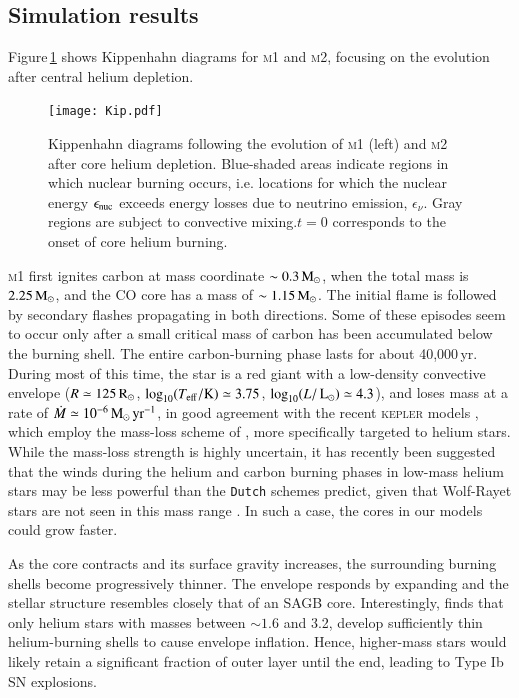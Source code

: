 \documentclass[twocolumn]{aa}
\begin{document}
\subsection{Simulation results}
Figure\,\ref{fig:1} shows Kippenhahn diagrams for 
 \textsc{m1} and \textsc{m2}, focusing on the evolution after central helium depletion.
\begin{figure}[htb!]
  \centering 
  \texttt{[image: Kip.pdf]}
  \caption{Kippenhahn diagrams following the evolution of \textsc{m1} (left) and \textsc{m2} after core helium depletion. Blue-shaded areas indicate regions in which nuclear burning occurs, i.e. locations for which the nuclear energy $\epsilon_{\rm nuc}$ exceeds energy losses due to neutrino emission, $\epsilon_\nu$. Gray regions are subject to convective mixing.$t=0$ corresponds to the onset of core helium burning.}
  \label{fig:1}
\end{figure}
\textsc{m1} first ignites carbon at mass coordinate $\sim 0.3\mathrm{\,M_\odot}$, when the total mass  is $ 2.25\mathrm{\,M_\odot}$, and the CO core has a mass of $\sim 1.15\mathrm{\,M_\odot}$.  
The initial flame is followed by secondary flashes propagating in both 
directions. Some of these episodes seem to occur only after a small critical 
mass of carbon has been accumulated below the burning shell. The entire carbon-burning phase lasts for about 
40,000\,yr. During most of this time, the star is a red giant with a low-density convective envelope  
($R\simeq 125\mathrm{\,R_\odot}$, $\log_{10} (T_{\mathrm{eff}} /\mathrm{K})\simeq 3.75$, $\log_{10} (L/\mathrm{\,L_\odot})\simeq 
4.3$), and loses mass at a rate of  
$\dot{M}\simeq10^{-6}\mathrm{\,M_{\odot}\,yr^{-1}}$, in good agreement with the
recent \textsc{kepler} models \citep{Woosley:2019sdf}, which employ the mass-loss scheme of \cite{Yoon:2017dme}, more specifically targeted to helium stars. While the mass-loss strength is highly uncertain, it has recently been suggested that the winds during the helium and carbon burning phases in low-mass helium stars may be less powerful than the \texttt{Dutch} schemes predict, given that Wolf-Rayet stars are not seen in this mass range \citep{Graefener2017,Vink:2017ujd}. In such a case, the cores in our models could grow faster.

As the core contracts and its surface gravity increases, the surrounding burning shells become progressively thinner. The envelope responds by expanding  and the stellar structure resembles closely that of an SAGB core. Interestingly, \cite{Woosley:2019sdf} finds that only helium stars with masses between $\sim 1.6$ and 3.2\msun, develop sufficiently thin helium-burning shells to cause envelope inflation. Hence, higher-mass stars would likely retain a significant fraction of outer layer until the end, leading to Type Ib SN explosions.
\end{document}
